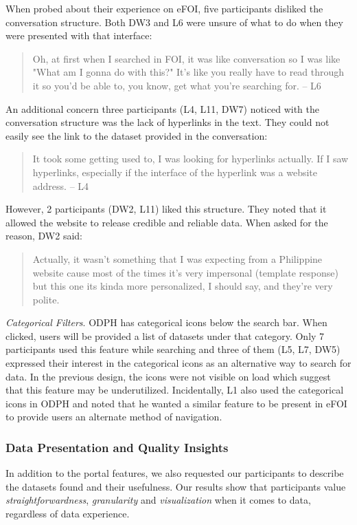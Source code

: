 \documentclass{sigchi}
\begin{document}
When probed about their experience on eFOI, five participants disliked the conversation structure. Both DW3 and L6 were unsure of what to do when they were presented with that interface:
\begin{quote}
Oh, at first when I searched in FOI, it was like conversation so I was like "What am I gonna do with this?" It's like you really have to read through it so you'd be able to, you know, get what you're searching for. -- L6
\end{quote}

An additional concern three participants (L4, L11, DW7) noticed with the conversation structure was the lack of hyperlinks in the text. They could not easily see the link to the dataset provided in the conversation: 
\begin{quote}
It took some getting used to, I was looking for hyperlinks actually. If I saw hyperlinks, especially if the interface of the hyperlink was a website address. -- L4
\end{quote}

However, 2 participants (DW2, L11) liked this structure. They noted that it allowed the website to release credible and reliable data. When asked for the reason, DW2 said:
\begin{quote}
    Actually, it wasn't something that I was expecting from a Philippine website cause most of the times it's very impersonal (template response) but this one its kinda more personalized, I should say, and they're very polite.
\end{quote}

\textit{Categorical Filters}. ODPH has categorical icons below the search bar. When clicked, users will be provided a list of datasets under that category. Only 7 participants used this feature while searching and three of them (L5, L7, DW5) expressed their interest in the categorical icons as an alternative way to search for data. In the previous design, the icons were not visible on load which suggest that this feature may be underutilized. Incidentally, L1 also used the categorical icons in ODPH and noted that he wanted a similar feature to be present in eFOI to provide users an alternate method of navigation.


\subsubsection{Data Presentation and Quality Insights}
In addition to the portal features, we also requested our participants to describe the datasets found and their usefulness. Our results show that participants value \textit{straightforwardness}, \textit{granularity} and \textit{visualization} when it comes to data, regardless of data experience. 
\end{document}
